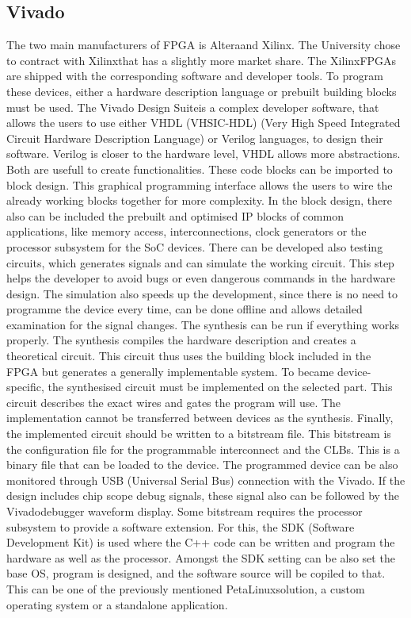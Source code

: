 \subsection{Vivado} %
The two main manufacturers of FPGA is Altera\texttrademark and Xilinx\texttrademark.
The University chose to contract with Xilinx\texttrademark that has a slightly more market share.
The Xilinx\texttrademark FPGAs are shipped with the corresponding software and developer tools.
To program these devices, either a hardware description language or prebuilt building blocks must be used.
The Vivado Design Suite\texttrademark is a complex developer software, that allows the users to use either VHDL (VHSIC-HDL) (Very High Speed Integrated Circuit Hardware Description Language) or Verilog languages, to design their software.
Verilog is closer to the hardware level, VHDL allows more abstractions.
Both are usefull to create functionalities.
These code blocks can be imported to block design.
This graphical programming interface allows the users to wire the already working blocks together for more complexity.
In the block design, there also can be included the prebuilt and optimised IP blocks of common applications, like memory access, interconnections, clock generators or the processor subsystem for the SoC devices.
There can be developed also testing circuits, which generates signals and can simulate the working circuit.
This step helps the developer to avoid bugs or even dangerous commands in the hardware design.
The simulation also speeds up the development, since there is no need to programme the device every time, can be done offline and allows detailed examination for the signal changes.
The synthesis can be run if everything works properly.
The synthesis compiles the hardware description and creates a theoretical circuit.
This circuit thus uses the building block included in the FPGA but generates a generally implementable system.
To became device-specific, the synthesised circuit must be implemented on the selected part.
This circuit describes the exact wires and gates the program will use.
The implementation cannot be transferred between devices as the synthesis.
Finally, the implemented circuit should be written to a bitstream file.
This bitstream is the configuration file for the programmable interconnect and the CLBs.
This is a binary file that can be loaded to the device.
The programmed device can be also monitored through USB (Universal Serial Bus) connection with the Vivado\texttrademark.
If the design includes chip scope debug signals, these signal also can be followed by the Vivado\texttrademark debugger waveform display.
Some bitstream requires the processor subsystem to provide a software extension.
For this, the SDK (Software Development Kit) is used where the C++ code can be written and program the hardware as well as the processor.
Amongst the SDK setting can be also set the base OS, program is designed, and the software source will be copiled to that. 
This can be one of the previously mentioned PetaLinux\texttrademark solution, a custom operating system or a standalone application.

